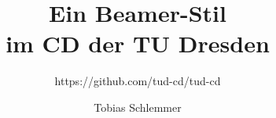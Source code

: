 \documentclass[ngerman,aspectratio=141]{beamer}%
\title{Ein Beamer-Stil\protect\\ im CD der TU Dresden}
\subtitle{https://github.com/tud-cd/tud-cd}
\author{Tobias Schlemmer}
\begin{document}
\maketitle
\begin{frame}\tiny
  
\end{frame}
\end{document}
